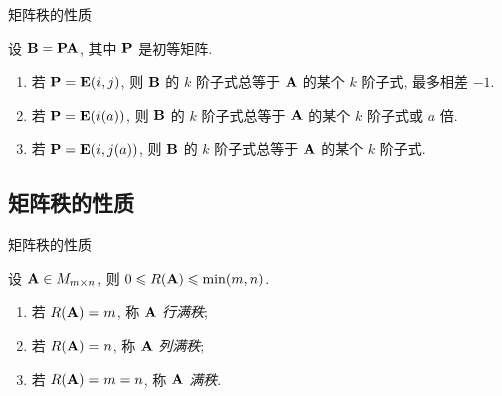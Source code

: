 \begin{frame}{矩阵秩的性质}
	\onslide<+->
	\begin{proof*}
		设 ${\mathbf{B}}={\mathbf{P}}{\mathbf{A}}$, 其中 ${\mathbf{P}}$ 是初等矩阵.
		\begin{enumerate}
			\item 若 ${\mathbf{P}}={\mathbf{E}}(i,j)$, 则 ${\mathbf{B}}$ 的 $k$ 阶子式总等于 ${\mathbf{A}}$ 的某个 $k$ 阶子式, 最多相差 $-1$.
			\item 若 ${\mathbf{P}}={\mathbf{E}}(i(a))$, 则 ${\mathbf{B}}$ 的 $k$ 阶子式总等于 ${\mathbf{A}}$ 的某个 $k$ 阶子式或 $a$ 倍.
			\item 若 ${\mathbf{P}}={\mathbf{E}}(i,j(a))$, 则 ${\mathbf{B}}$ 的 $k$ 阶子式总等于 ${\mathbf{A}}$ 的某个 $k$ 阶子式.
		\end{enumerate}


	\end{proof*}
\end{frame}


\subsection{矩阵秩的性质}

\begin{frame}{矩阵秩的性质}
	\onslide<+->
	\begin{proposition}
		设 ${\mathbf{A}}\in M_{m\times n}$, 则 $0\leqslant R({\mathbf{A}})\leqslant \min(m,n)$.
	\end{proposition}
	\onslide<+->
	\begin{definition}
		\begin{enumerate}
			\item 若 $R({\mathbf{A}})=m$, 称 ${\mathbf{A}}$ \emph{行满秩};
			\item 若 $R({\mathbf{A}})=n$, 称 ${\mathbf{A}}$ \emph{列满秩};
			\item 若 $R({\mathbf{A}})=m=n$, 称 ${\mathbf{A}}$ \emph{满秩}.
		\end{enumerate}
	\end{definition}
\end{frame}


